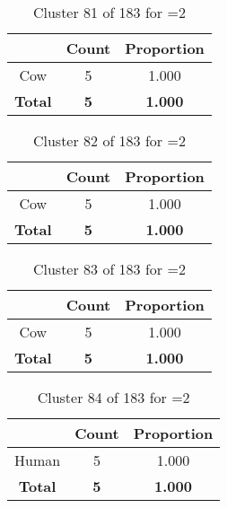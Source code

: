 \begin{table}[ht!]
\centering
\begin{tabular}{|c|c|c|}
\hline
\bf \Spec{} &\bf Count &\bf Proportion\\ \hline \hline
Cow & 5 & 1.000\\ \hline
\hline
\bf Total & \bf 5 & \bf 1.000\\ \hline
\end{tabular}
\label{tab:cluster:81:2}
\caption{Cluster 81 of 183 for \minneigh{}=2}
\end{table}

\begin{table}[ht!]
\centering
\begin{tabular}{|c|c|c|}
\hline
\bf \Spec{} &\bf Count &\bf Proportion\\ \hline \hline
Cow & 5 & 1.000\\ \hline
\hline
\bf Total & \bf 5 & \bf 1.000\\ \hline
\end{tabular}
\label{tab:cluster:82:2}
\caption{Cluster 82 of 183 for \minneigh{}=2}
\end{table}

\begin{table}[ht!]
\centering
\begin{tabular}{|c|c|c|}
\hline
\bf \Spec{} &\bf Count &\bf Proportion\\ \hline \hline
Cow & 5 & 1.000\\ \hline
\hline
\bf Total & \bf 5 & \bf 1.000\\ \hline
\end{tabular}
\label{tab:cluster:83:2}
\caption{Cluster 83 of 183 for \minneigh{}=2}
\end{table}

\begin{table}[ht!]
\centering
\begin{tabular}{|c|c|c|}
\hline
\bf \Spec{} &\bf Count &\bf Proportion\\ \hline \hline
Human & 5 & 1.000\\ \hline
\hline
\bf Total & \bf 5 & \bf 1.000\\ \hline
\end{tabular}
\label{tab:cluster:84:2}
\caption{Cluster 84 of 183 for \minneigh{}=2}
\end{table}

